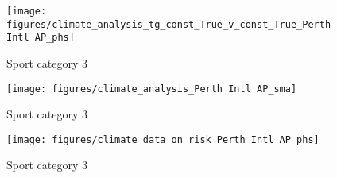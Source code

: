 \documentclass[11pt]{article}
\begin{document}
%

    \begin{figure}[htb!]
        \centering
        \texttt{[image: figures/climate\_analysis\_tg\_const\_True\_v\_const\_True\_Perth Intl AP\_phs]}
        \caption{Sport category 3}
    \end{figure}
    \begin{figure}[htb!]
            \centering
            \texttt{[image: figures/climate\_analysis\_Perth Intl AP\_sma]}
            \caption{Sport category 3}
        \end{figure}
    \begin{figure}[htb!]
            \centering
            \texttt{[image: figures/climate\_data\_on\_risk\_Perth Intl AP\_phs]}
            \caption{Sport category 3}
        \end{figure}
\end{document}
